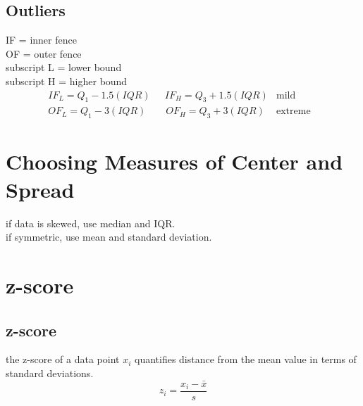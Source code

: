 \documentclass{report}
\begin{document}
    \subsection{Outliers}
    IF = inner fence\\
    OF = outer fence\\
    subscript L = lower bound\\
    subscript H = higher bound
    \begin{align}
      &IF_L=Q_1-1.5(IQR) \quad\ \ IF_H=Q_3+1.5(IQR) &\text{mild} &&\\
      &OF_L=Q_1-3(IQR) \qquad OF_H=Q_3+3(IQR) &\text{extreme}
    \end{align}

	\section{Choosing Measures of Center and Spread}
	if data is skewed, use median and IQR.\\
	if symmetric, use mean and standard deviation.

	\section{z-score}
    \subsection{z-score}
    the z-score of a data point $x_i$ quantifies distance from the mean value in terms of standard deviations.
    \[z_i=\frac{x_i-\bar{x}}{s}\] 
\end{document}
